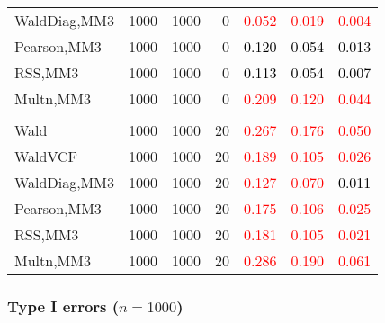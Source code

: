 \documentclass[
]{article}
\begin{document}
\begin{table}[H]
{\begin{tabular}[t]{lrrrrrr}
\hspace{1em}WaldDiag,MM3 & 1000 & 1000 & 0 & \textcolor{red}{0.052} & \textcolor{red}{0.019} & \textcolor{red}{0.004}\\
\hspace{1em}Pearson,MM3 & 1000 & 1000 & 0 & \textcolor{black}{0.120} & \textcolor{black}{0.054} & \textcolor{black}{0.013}\\
\hspace{1em}RSS,MM3 & 1000 & 1000 & 0 & \textcolor{black}{0.113} & \textcolor{black}{0.054} & \textcolor{black}{0.007}\\
\hspace{1em}Multn,MM3 & 1000 & 1000 & 0 & \textcolor{red}{0.209} & \textcolor{red}{0.120} & \textcolor{red}{0.044}\\
\addlinespace[0.3em]
\multicolumn{7}{l}{\textbf{3F 15V}}\\
\hspace{1em}Wald & 1000 & 1000 & 20 & \textcolor{red}{0.267} & \textcolor{red}{0.176} & \textcolor{red}{0.050}\\
\hspace{1em}WaldVCF & 1000 & 1000 & 20 & \textcolor{red}{0.189} & \textcolor{red}{0.105} & \textcolor{red}{0.026}\\
\hspace{1em}WaldDiag,MM3 & 1000 & 1000 & 20 & \textcolor{red}{0.127} & \textcolor{red}{0.070} & \textcolor{black}{0.011}\\
\hspace{1em}Pearson,MM3 & 1000 & 1000 & 20 & \textcolor{red}{0.175} & \textcolor{red}{0.106} & \textcolor{red}{0.025}\\
\hspace{1em}RSS,MM3 & 1000 & 1000 & 20 & \textcolor{red}{0.181} & \textcolor{red}{0.105} & \textcolor{red}{0.021}\\
\hspace{1em}Multn,MM3 & 1000 & 1000 & 20 & \textcolor{red}{0.286} & \textcolor{red}{0.190} & \textcolor{red}{0.061}\\
\bottomrule
\end{tabular}}
\endgroup{}
\end{table}

\hypertarget{type-i-errors-n1000-3}{%
\subsubsection{\texorpdfstring{Type I errors
(\(n=1000\))}{Type I errors (n=1000)}}\label{type-i-errors-n1000-3}}
\end{document}
